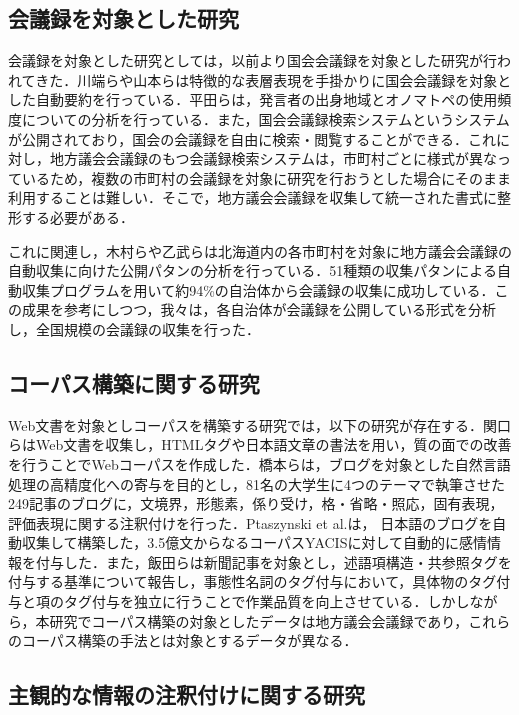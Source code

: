 \documentclass[japanese]{jnlp_1.4}
\begin{document}
\subsection{会議録を対象とした研究}

会議録を対象とした研究としては，以前より国会会議録を対象とした研究が行われてきた．川端ら\cite{kwbt}や山本ら\cite{ymmt}は特徴的な表層表現を手掛かりに国会会議録を対象とした自動要約を行っている．平田ら\cite{hrt}は，発言者の出身地域とオノマトペの使用頻度についての分析を行っている．また，国会会議録検索システムというシステムが公開されており，国会の会議録を自由に検索・閲覧することができる．これに対し，地方議会会議録のもつ会議録検索システムは，市町村ごとに様式が異なっているため，複数の市町村の会議録を対象に研究を行おうとした場合にそのまま利用することは難しい．そこで，地方議会会議録を収集して統一された書式に整形する必要がある．

これに関連し，木村ら\cite{kim1}や乙武ら\cite{ottk}は北海道内の各市町村を対象に地方議会会議録の自動収集に向けた公開パタンの分析を行っている．51種類の収集パタンによる自動収集プログラムを用いて約94\%の自治体から会議録の収集に成功している．この成果を参考にしつつ，我々は，各自治体が会議録を公開している形式を分析し，全国規模の会議録の収集を行った．


\subsection{コーパス構築に関する研究}

Web文書を対象としコーパスを構築する研究では，以下の研究が存在する．関口ら\cite{skgc}はWeb文書を収集し，HTMLタグや日本語文章の書法を用い，質の面での改善を行うことでWebコーパスを作成した．橋本ら\cite{hsmt}は，ブログを対象とした自然言語処理の高精度化への寄与を目的とし，81名の大学生に4つのテーマで執筆させた249記事のブログに，文境界，形態素，係り受け，格・省略・照応，固有表現，評価表現に関する注釈付けを行った．Ptaszynski et al.\cite{ptas}は，
日本語のブログを自動収集して構築した，3.5億文からなるコーパスYACISに対して自動的に感情情報を付与した．また，飯田ら\cite{iid}は新聞記事を対象とし，述語項構造・共参照タグを付与する基準について報告し，事態性名詞のタグ付与において，具体物のタグ付与と項のタグ付与を独立に行うことで作業品質を向上させている．しかしながら，本研究でコーパス構築の対象としたデータは地方議会会議録であり，これらのコーパス構築の手法とは対象とするデータが異なる．


\subsection{主観的な情報の注釈付けに関する研究}
\end{document}
